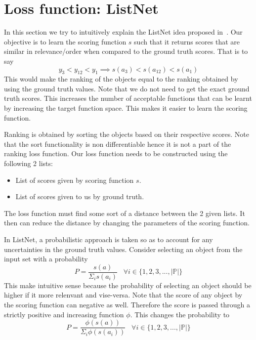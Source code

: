 \documentclass[12pt, twoside, ngerman]{report}
\begin{document}
\section{Loss function: ListNet}

In this section we try to intuitively explain the ListNet idea proposed in~\cite{listwisebetter}.
Our objective is to learn the scoring function $s$ such that it returns scores that are similar in relevance/order when compared to the ground truth scores.
That is to say
$$
y_3 < y_{12} < y_1 \implies s(a_3) < s(a_{12}) < s(a_1)
$$
This would make the ranking of the objects equal to the ranking obtained by using the ground truth values.
Note that we do not need to get the exact ground truth scores.
This increases the number of acceptable functions that can be learnt by increasing the target function space.
This makes it easier to learn the scoring function.

Ranking is obtained by sorting the objects based on their respective scores.
Note that the sort functionality is non differentiable hence it is not a 
part of the ranking loss function.
Our loss function needs to be constructed using the following 2 lists:
\begin{itemize}
\item List of scores given by scoring function $s$.
\item List of scores given to us by ground truth.
\end{itemize}

The loss function must find some sort of a distance between the 2 given lists.
It then can reduce the distance by changing the parameters of the scoring function.

In ListNet,  a probabilistic approach is taken so as to account for any uncertainties in the ground truth values.
Consider selecting an object from the input set with a probability
$$
P = \frac{s(a)}{\Sigma_i s(a_i)} \;\;\; \forall i \in \{1, 2, 3, ...,  |\mathbb{P}|\}
$$
This make intuitive sense because the probability of selecting an object should be higher if it more relenvant and vise-versa.
Note that the score of any object by the scoring function can negative as well.
Therefore the score is passed through a strictly positive and increasing function $\phi$.
This changes the probability to
\begin{equation}\label{eq:objselection}
P = \frac{\phi(s(a))}{\Sigma_i \phi(s(a_i))} \;\;\; \forall i \in \{1, 2, 3, ...,  |\mathbb{P}|\}
\end{equation}
\end{document}
